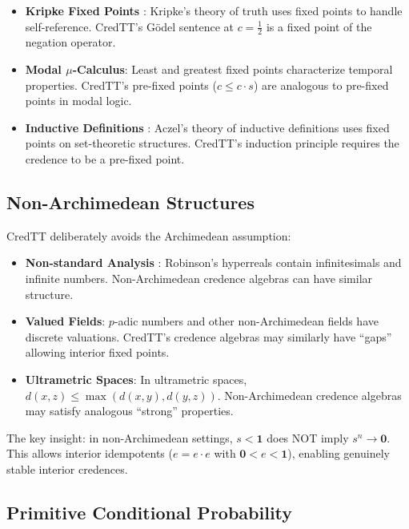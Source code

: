 \documentclass[11pt,a4paper]{article}
\newcommand{\one}{\mathbf{1}}
\newcommand{\zero}{\mathbf{0}}
\begin{document}
\begin{itemize}
    \item \textbf{Kripke Fixed Points} \citep{kripke1975outline}: Kripke's theory of truth uses fixed points to handle self-reference. CredTT's G\"odel sentence at $c = \tfrac{1}{2}$ is a fixed point of the negation operator.

    \item \textbf{Modal $\mu$-Calculus}: Least and greatest fixed points characterize temporal properties. CredTT's pre-fixed points ($c \leq c \cdot s$) are analogous to pre-fixed points in modal logic.

    \item \textbf{Inductive Definitions} \citep{aczel1977inductive}: Aczel's theory of inductive definitions uses fixed points on set-theoretic structures. CredTT's induction principle requires the credence to be a pre-fixed point.
\end{itemize}

\subsection{Non-Archimedean Structures}

CredTT deliberately avoids the Archimedean assumption:

\begin{itemize}
    \item \textbf{Non-standard Analysis} \citep{robinson1966nonstandard}: Robinson's hyperreals contain infinitesimals and infinite numbers. Non-Archimedean credence algebras can have similar structure.

    \item \textbf{Valued Fields}: $p$-adic numbers and other non-Archimedean fields have discrete valuations. CredTT's credence algebras may similarly have ``gaps'' allowing interior fixed points.

    \item \textbf{Ultrametric Spaces}: In ultrametric spaces, $d(x,z) \leq \max(d(x,y), d(y,z))$. Non-Archimedean credence algebras may satisfy analogous ``strong'' properties.
\end{itemize}

The key insight: in non-Archimedean settings, $s < \one$ does NOT imply $s^n \to \zero$. This allows interior idempotents ($e = e \cdot e$ with $\zero < e < \one$), enabling genuinely stable interior credences.

\subsection{Primitive Conditional Probability}
\end{document}
